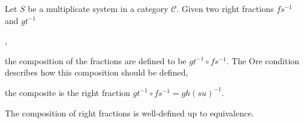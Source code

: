     \begin{definition}
        Let $S$ be a multiplicate system in a category $\mathcal{C}$. Given two right fractions $fs^{-1}$ and $gt^{-1}$
        \begin{center}
            , 
        \end{center}
        the composition of the fractions are defined to be $gt^{-1}\circ fs^{-1}$. The Ore condition describes how this composition should be defined,
        \begin{center}
        \end{center}
        the composite is the right fraction $gt^{-1}\circ fs^{-1} = gh(su)^{-1}$.
    \end{definition}

    \begin{prop}
        The composition of right fractions is well-defined up to equivalence.
    \end{prop}

